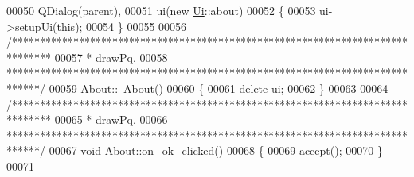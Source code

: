 \begin{DoxyCode}
00050   QDialog(parent),
00051   ui(new \hyperlink{namespace_ui}{Ui}::about)
00052 \{
00053   ui->setupUi(\textcolor{keyword}{this});
00054 \}
00055 
00056 \textcolor{comment}{/*******************************************************************************}
00057 \textcolor{comment}{ * drawPq.}
00058 \textcolor{comment}{ ******************************************************************************/}
\hypertarget{about_8cpp_source_l00059}{}\hyperlink{group___window_gace60197b1b610998908036ee1f802204}{00059} \hyperlink{group___window_gace60197b1b610998908036ee1f802204}{About::~About}()
00060 \{
00061   \textcolor{keyword}{delete} ui;
00062 \}
00063 
00064 \textcolor{comment}{/*******************************************************************************}
00065 \textcolor{comment}{ * drawPq.}
00066 \textcolor{comment}{ ******************************************************************************/}
00067 \textcolor{keywordtype}{void} About::on\_ok\_clicked()
00068 \{
00069   accept();
00070 \}
00071 
\end{DoxyCode}
